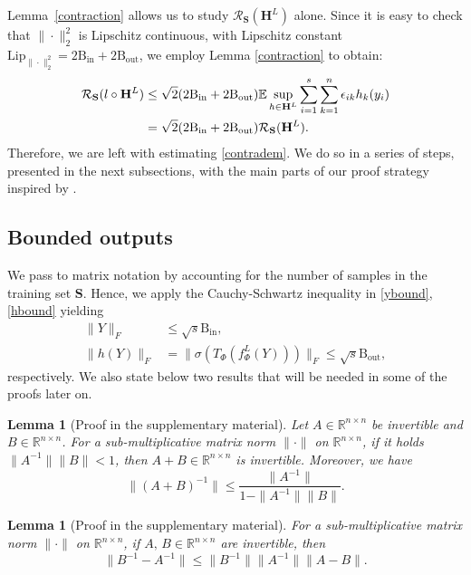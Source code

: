 \documentclass[preprint,12pt]{elsarticle}
\newtheorem{lemma}[theorem]{Lemma}
\begin{document}
Lemma~\ref{contraction} allows us to study $\mathcal{R}_\mathbf{S}(\mathbf{H}^L)$ alone. Since it is easy to check that $\|\cdot\|^2_2$ is Lipschitz continuous, with Lipschitz constant $\mathrm{Lip}_{\|\cdot\|^2_2}=2\mathrm{B_{in}}+2\mathrm{B_{out}}$, we employ Lemma \ref{contraction} to obtain:
\begin{align}
    \mathcal{R}_\mathbf{S}(l\circ\mathbf{H}^L)&\leq\sqrt{2}(2\mathrm{B_{in}}+2\mathrm{B_{out}})\mathbb{E}\sup_{h\in\mathbf{H}^L}\sum_{i=1}^s\sum_{k=1}^n\epsilon_{ik}h_k(y_i)\notag\\
    \label{contradem}
    &=\sqrt{2}(2\mathrm{B_{in}}+2\mathrm{B_{out}})\mathcal{R}_\mathbf{S}(\mathbf{H}^L).
\end{align}
Therefore, we are left with estimating \eqref{contradem}. We do so in a series of steps, presented in the next subsections, with the main parts of our proof strategy inspired by \cite{istagen}.

\subsection{Bounded outputs}\label{boundsec}

We pass to matrix notation by accounting for the number of samples in the training set $\mathbf{S}$. Hence, we apply the Cauchy-Schwartz inequality in \eqref{ybound}, \eqref{hbound} yielding
\begin{align}
\label{boundedin}
\|Y\|_F&\leq\sqrt{s}\mathrm{B}_{\text{in}},\\
\label{boundedout}
\|h(Y)\|_F&=\|\sigma(T_\Phi(f_{\Phi}^L(Y)))\|_F\leq\sqrt{s}\mathrm{B}_{\text{out}},
\end{align}
respectively. We also state below two results that will be needed in some of the proofs later on.

\begin{lemma}[Proof in the supplementary material]\label{invab}
    Let $A\in\mathbb{R}^{n\times n}$ be invertible and $B\in\mathbb{R}^{n\times n}$. For a sub-multiplicative matrix norm $\|\cdot\|$ on $\mathbb{R}^{n\times n}$, if it holds $\|A^{-1}\|\|B\|<1$, then $A+B\in\mathbb{R}^{n\times n}$ is invertible. Moreover, we have
    \begin{equation}
        \|(A+B)^{-1}\|\leq\frac{\|A^{-1}\|}{1-\|A^{-1}\|\|B\|}.
    \end{equation}
\end{lemma}

\begin{lemma}[Proof in the supplementary material]\label{invsubtract}
    For a sub-multiplicative matrix norm $\|\cdot\|$ on $\mathbb{R}^{n\times n}$, if $A,\,B\in\mathbb{R}^{n\times n}$ are invertible, then
    \begin{equation}
        \|B^{-1}-A^{-1}\|\leq\|B^{-1}\|\|A^{-1}\|\|A-B\|.
    \end{equation}
\end{lemma}
\end{document}
